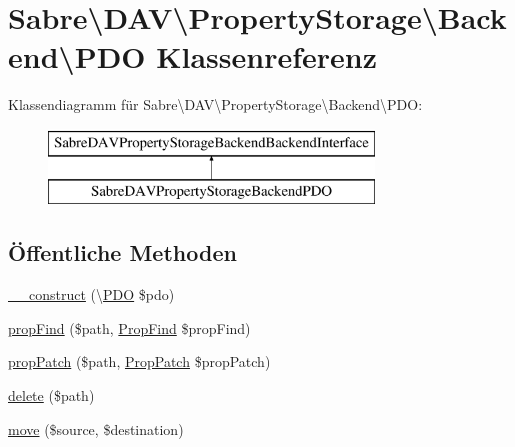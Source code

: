 \hypertarget{class_sabre_1_1_d_a_v_1_1_property_storage_1_1_backend_1_1_p_d_o}{}\section{Sabre\textbackslash{}D\+AV\textbackslash{}Property\+Storage\textbackslash{}Backend\textbackslash{}P\+DO Klassenreferenz}
\label{class_sabre_1_1_d_a_v_1_1_property_storage_1_1_backend_1_1_p_d_o}
Klassendiagramm für Sabre\textbackslash{}D\+AV\textbackslash{}Property\+Storage\textbackslash{}Backend\textbackslash{}P\+DO\+:\begin{figure}[H]
\begin{center}
\leavevmode
\includegraphics[height=2.000000cm]{class_sabre_1_1_d_a_v_1_1_property_storage_1_1_backend_1_1_p_d_o}
\end{center}
\end{figure}
\subsection*{Öffentliche Methoden}
\begin{DoxyCompactItemize}
\item 
\mbox{\hyperlink{class_sabre_1_1_d_a_v_1_1_property_storage_1_1_backend_1_1_p_d_o_a05f4bacb0121840781cca0954a6f6e80}{\+\_\+\+\_\+construct}} (\textbackslash{}\mbox{\hyperlink{class_sabre_1_1_d_a_v_1_1_property_storage_1_1_backend_1_1_p_d_o}{P\+DO}} \$pdo)
\item 
\mbox{\hyperlink{class_sabre_1_1_d_a_v_1_1_property_storage_1_1_backend_1_1_p_d_o_a3261703333018d1154443fae0828eaf8}{prop\+Find}} (\$path, \mbox{\hyperlink{class_sabre_1_1_d_a_v_1_1_prop_find}{Prop\+Find}} \$prop\+Find)
\item 
\mbox{\hyperlink{class_sabre_1_1_d_a_v_1_1_property_storage_1_1_backend_1_1_p_d_o_ad4d5bc14b0dcbb4546a0d8f999924cf1}{prop\+Patch}} (\$path, \mbox{\hyperlink{class_sabre_1_1_d_a_v_1_1_prop_patch}{Prop\+Patch}} \$prop\+Patch)
\item 
\mbox{\hyperlink{class_sabre_1_1_d_a_v_1_1_property_storage_1_1_backend_1_1_p_d_o_a4a9b088694e295dba8ad668e85808d7f}{delete}} (\$path)
\item 
\mbox{\hyperlink{class_sabre_1_1_d_a_v_1_1_property_storage_1_1_backend_1_1_p_d_o_ab9d5112e4e012c25158c1d8fb66c2fa3}{move}} (\$source, \$destination)
\end{DoxyCompactItemize}
